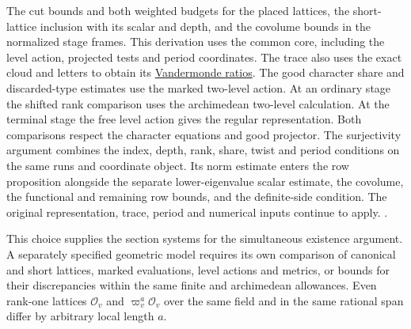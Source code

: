 {The cut bounds and both weighted budgets for the placed lattices,
the short-lattice inclusion with its scalar and depth, and the
covolume bounds in the normalized stage frames. This derivation
uses the common core, including the level action, projected tests
and period coordinates.}
The trace also uses the exact cloud and letters to obtain its
\hyperlink{proof.trace-word-ratios}{Vandermonde ratios}. The good
character share and discarded-type estimates use the marked two-level
action. At an ordinary stage the shifted rank comparison uses the
archimedean two-level calculation. At the terminal stage the free
level action gives the regular representation. Both comparisons
respect the character equations and good projector. The surjectivity
argument combines the index, depth, rank, share, twist and period
conditions on the same runs and coordinate object. Its norm estimate
enters the row proposition alongside the separate lower-eigenvalue
scalar estimate, the covolume, the functional and remaining row
bounds, and the definite-side condition. The original representation,
trace, period and numerical inputs continue to apply.
.

This choice supplies the section systems for the simultaneous
existence argument. A separately specified geometric model requires
its own comparison of canonical and short lattices, marked evaluations,
level actions and metrics, or bounds for their discrepancies within
the same finite and archimedean allowances. Even rank-one lattices
\(\mathcal O_v\) and \(\varpi_v^a\mathcal O_v\) over the same field
and in the same rational span differ by arbitrary local length \(a\).
